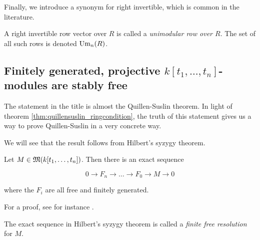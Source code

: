 Finally, we introduce a synonym for right invertible, which is common in the literature.

\begin{definition}
  A right invertible row vector over $R$ is called a \emph{unimodular row over $R$}.
  The set of all such rows is denoted $\text{Um}_n(R)$.
\end{definition}

\subsection{Finitely generated, projective $k[t_1, \dots, t_n]$-modules are stably free}

The statement in the title is almost the Quillen-Suslin theorem.
In light of theorem \ref{thm:quillensuslin_ringcondition}, the truth of this statement gives us a way to prove Quillen-Suslin in a very concrete way.

We will see that the result follows from Hilbert's syzygy theorem.

\begin{theorem}
\label{thm:hilbertsyzygy}
  Let $M \in \mathfrak M(k[t_1, \dots, t_n])$.
  Then there is an exact sequence

  \[
    0 \rightarrow F_n \rightarrow \dots \rightarrow F_0 \rightarrow M \rightarrow 0
  \]

  where the $F_i$ are all free and finitely generated.
\end{theorem}

For a proof, see for instance \citep[p.~208]{kunz85}.

The exact sequence in Hilbert's syzygy theorem is called a \emph{finite free resolution} for $M$.

